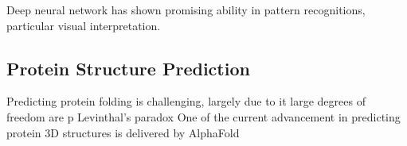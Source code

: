 Deep neural network has shown promising ability in pattern recognitions, particular visual interpretation.
\par 

\subsection{Protein Structure Prediction}
Predicting protein folding is challenging, largely due to it large degrees of freedom are p Levinthal's paradox One of the current advancement in predicting protein 3D structures is delivered by AlphaFold